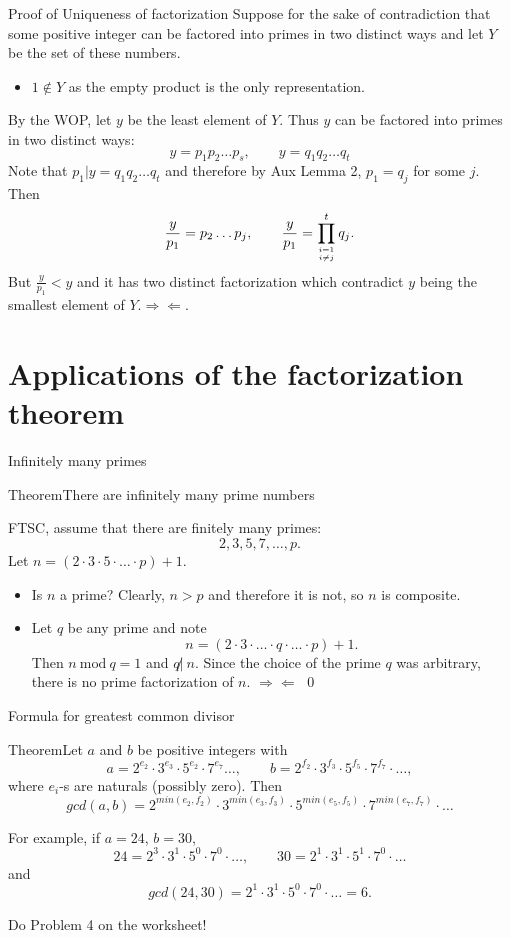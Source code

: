 \documentclass{beamer}
\def\bl[#1]#2{\begin{block}{#1}#2\end{block}}
\def\itemb{\begin{itemize}}
\def\iteme{\end{itemize}}
\def\mod{~\textrm{mod}~}
\begin{document}
\begin{frame}{Proof of Uniqueness of factorization}
Suppose for the sake of contradiction that some positive integer can be factored into primes in two distinct ways and let $Y$ be the set of these numbers.
\itemb
\item $1\notin Y$ as the empty product is the only representation.
\iteme
By the WOP, let $y$ be the least element of $Y$. Thus $y$ can be factored into primes in two distinct ways:
\[
y=p_1p_2\dots p_s,\qquad y=q_1q_2\dots q_t
\]
Note that $p_1|y=q_1q_2\dots q_t$ and therefore by Aux Lemma 2, $p_1=q_j$ for some $j$. Then
\[
\frac{y}{p_1}=p_2\dots p_j,\qquad \frac{y}{p_1}=\prod_{i=1\atop i\neq j}^tq_j.
\]
But $\frac{y}{p_1}<y$ and it has two distinct factorization which contradict $y$ being the smallest element of $Y$.$\Rightarrow\Leftarrow$.
\end{frame}

\section{Applications of the factorization theorem}

\begin{frame}{Infinitely many primes}
\bl[Theorem]{There are infinitely many prime numbers}
FTSC, assume that there are finitely many primes: 
\[
2,3,5,7,\dots,p.
\]
Let $n=(2\cdot 3\cdot 5\cdot\dots\cdot p)+1$. 
\itemb
\item Is $n$ a prime? Clearly, $n>p$ and therefore it is not, so $n$ is composite.
\item Let $q$ be any prime and note
\[
n=(2\cdot 3\cdot\dots\cdot q\cdot\dots\cdot p)+1.
\]
Then $n\mod q=1$ and $q\not|~ n$. Since the choice of the prime $q$ was arbitrary, there is no prime factorization of $n$.    $\Rightarrow\Leftarrow$ \qed
\iteme
\end{frame}

\begin{frame}{Formula for greatest common divisor}
\bl[Theorem]{Let $a$ and $b$ be positive integers with
\[
a=2^{e_2}\cdot 3^{e_3}\cdot 5^{e_2}\cdot 7^{e_7}\dots,\qquad b=2^{f_2}\cdot 3^{f_3}\cdot 5^{f_5}\cdot 7^{f_7}\cdot\dots,
\]
where $e_i$-s are naturals (possibly zero). Then 
\[
gcd(a,b)=2^{min(e_2,f_2)}\cdot 3^{min(e_3,f_3)}\cdot 5^{min(e_5,f_5)}\cdot 7^{min(e_7,f_7)}\cdot\dots
\]}
For example, if $a=24$, $b=30$,
\[
24=2^3\cdot 3^1\cdot 5^0\cdot 7^0\cdot \dots,\qquad 30=2^1\cdot 3^1\cdot 5^1\cdot 7^0\cdot\dots
\]
and
\[
gcd(24,30)=2^{1}\cdot 3^1\cdot 5^0\cdot 7^0\cdot\dots=6.
\]
\begin{center}
Do Problem 4 on the worksheet!
\end{center}
\end{frame}
\end{document}
